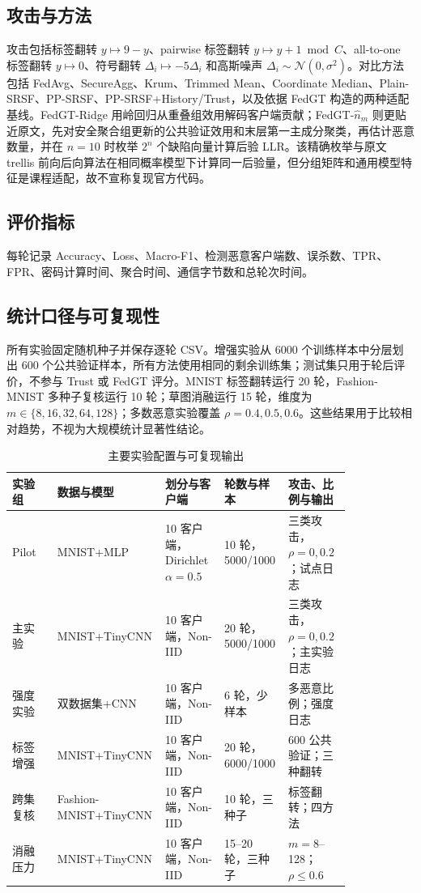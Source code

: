 \documentclass[final]{jcr}
\begin{document}
\subsection{攻击与方法}
攻击包括标签翻转 $y\mapsto 9-y$、pairwise 标签翻转 $y\mapsto y+1\bmod C$、all-to-one 标签翻转 $y\mapsto 0$、符号翻转 $\Delta_i\mapsto -5\Delta_i$ 和高斯噪声 $\Delta_i\sim \mathcal{N}(0,\sigma^2)$。对比方法包括 FedAvg、SecureAgg、Krum、Trimmed Mean、Coordinate Median、Plain-SRSF、PP-SRSF、PP-SRSF+History/Trust，以及依据 FedGT\cite{fedgt2025} 构造的两种适配基线。FedGT-Ridge 用岭回归从重叠组效用解码客户端贡献；FedGT-$\hat n_m$ 则更贴近原文，先对安全聚合组更新的公共验证效用和末层第一主成分聚类，再估计恶意数量，并在 $n=10$ 时枚举 $2^n$ 个缺陷向量计算后验 LLR。该精确枚举与原文 trellis 前向后向算法在相同概率模型下计算同一后验量，但分组矩阵和通用模型特征是课程适配，故不宣称复现官方代码。

\subsection{评价指标}
每轮记录 Accuracy、Loss、Macro-F1、检测恶意客户端数、误杀数、TPR、FPR、密码计算时间、聚合时间、通信字节数和总轮次时间。

\subsection{统计口径与可复现性}
所有实验固定随机种子并保存逐轮 CSV。增强实验从 6000 个训练样本中分层划出 600 个公共验证样本，所有方法使用相同的剩余训练集；测试集只用于轮后评价，不参与 Trust 或 FedGT 评分。MNIST 标签翻转运行 20 轮，Fashion-MNIST 多种子复核运行 10 轮；草图消融运行 15 轮，维度为 $m\in\{8,16,32,64,128\}$；多数恶意实验覆盖 $\rho=0.4,0.5,0.6$。这些结果用于比较相对趋势，不视为大规模统计显著性结论。

\begin{table}
\centering
{}
\caption{主要实验配置与可复现输出}{}
\label{tab:experiment-settings}
\begingroup
\setlength{\tabcolsep}{3pt}
\begin{tabular}{p{0.13\linewidth}p{0.18\linewidth}p{0.17\linewidth}p{0.17\linewidth}p{0.18\linewidth}}
\toprule
实验组 & 数据与模型 & 划分与客户端 & 轮数与样本 & 攻击、比例与输出\\
\midrule
Pilot & MNIST+MLP & 10 客户端，Dirichlet $\alpha=0.5$ & 10 轮，5000/1000 & 三类攻击，$\rho=0,0.2$；试点日志\\
主实验 & MNIST+TinyCNN & 10 客户端，Non-IID & 20 轮，5000/1000 & 三类攻击，$\rho=0,0.2$；主实验日志\\
强度实验 & 双数据集+CNN & 10 客户端，Non-IID & 6 轮，少样本 & 多恶意比例；强度日志\\
标签增强 & MNIST+TinyCNN & 10 客户端，Non-IID & 20 轮，6000/1000 & 600 公共验证；三种翻转\\
跨集复核 & Fashion-MNIST+TinyCNN & 10 客户端，Non-IID & 10 轮，三种子 & 标签翻转；四方法\\
消融压力 & MNIST+TinyCNN & 10 客户端，Non-IID & 15--20 轮，三种子 & $m=8$--128；$\rho\leq0.6$\\
\bottomrule
\end{tabular}
\endgroup
\end{table}
\end{document}
